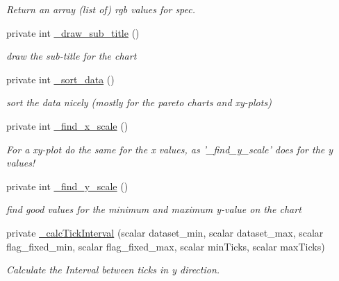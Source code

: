 \begin{DoxyCompactItemize}
\begin{DoxyCompactList}\small\item\em Return an array (list of) rgb values for spec. \item\end{DoxyCompactList}\item 
private int \hyperlink{classChart_1_1Base_afd4f3ee3925d1e765e099c80e6c98da7}{\_\-draw\_\-sub\_\-title} ()
\begin{DoxyCompactList}\small\item\em draw the sub-\/title for the chart \item\end{DoxyCompactList}\item 
private int \hyperlink{classChart_1_1Base_ade88df5ecdc74e50ea683b63424ba84a}{\_\-sort\_\-data} ()
\begin{DoxyCompactList}\small\item\em sort the data nicely (mostly for the pareto charts and xy-\/plots) \item\end{DoxyCompactList}\item 
private int \hyperlink{classChart_1_1Base_a694b293ee3d92e706b1743cb1fa9d09d}{\_\-find\_\-x\_\-scale} ()
\begin{DoxyCompactList}\small\item\em For a xy-\/plot do the same for the x values, as '\_\-find\_\-y\_\-scale' does for the y values! \item\end{DoxyCompactList}\item 
private int \hyperlink{classChart_1_1Base_acb2fe91b2d57e43d84b1bc6f092ac68d}{\_\-find\_\-y\_\-scale} ()
\begin{DoxyCompactList}\small\item\em find good values for the minimum and maximum y-\/value on the chart \item\end{DoxyCompactList}\item 
private \hyperlink{classChart_1_1Base_a23f7394cb8c7bbe6a5d0e05582e038c9}{\_\-calcTickInterval} (scalar dataset\_\-min, scalar dataset\_\-max, scalar flag\_\-fixed\_\-min, scalar flag\_\-fixed\_\-max, scalar minTicks, scalar maxTicks)
\begin{DoxyCompactList}\small\item\em Calculate the Interval between ticks in y direction. \item\end{DoxyCompactList}\item 

\end{DoxyCompactItemize}
